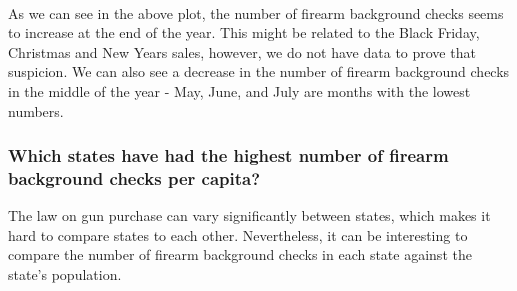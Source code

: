 \documentclass[11pt]{article}
\begin{document}
    \begin{center}
    \end{center}
    { \hspace*{\fill} \\}
    
    As we can see in the above plot, the number of firearm background checks
seems to increase at the end of the year. This might be related to the
Black Friday, Christmas and New Years sales, however, we do not have
data to prove that suspicion. We can also see a decrease in the number
of firearm background checks in the middle of the year - May, June, and
July are months with the lowest numbers.

    \hypertarget{which-states-have-had-the-highest-number-of-firearm-background-checks-per-capita}{%
\subsubsection{Which states have had the highest number of firearm
background checks per
capita?}\label{which-states-have-had-the-highest-number-of-firearm-background-checks-per-capita}}

The law on gun purchase can vary significantly between states, which
makes it hard to compare states to each other. Nevertheless, it can be
interesting to compare the number of firearm background checks in each
state against the state's population.
\end{document}
